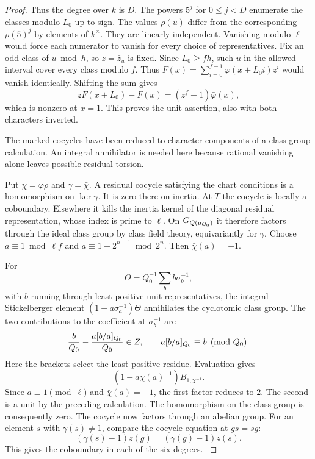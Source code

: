 \begin{proof}
Thus the degree over \(k\) is \(D\).
The powers \(5^j\) for \(0\le j<D\) enumerate the classes modulo
\(L_0\) up to sign. The values \(\bar\rho(u)\) differ from the
corresponding \(\bar\rho(5)^j\) by elements of \(k^\times\).
They are linearly independent. Vanishing modulo \(\ell\) would
force each numerator to vanish for every choice of representatives.
Fix an odd class of \(u\bmod h\), so \(z=\bar z_u\) is fixed.
Since \(L_0\ge fh\), such \(u\) in the allowed interval cover
every class modulo \(f\). Thus
\(F(x)=\sum_{i=0}^{f-1}\bar\varphi(x+L_0i)z^i\) would vanish
identically. Shifting the sum gives
\[
        zF(x+L_0)-F(x)=(z^f-1)\bar\varphi(x),
\]
which is nonzero at \(x=1\). This proves the unit assertion,
also with both characters inverted.
\hfill\mbox{\cite{washington-nonp}}\label{cor:ordinary-residual-characters-1}


The marked cocycles have been reduced to character components of a class-group calculation. An integral annihilator is needed here because rational vanishing alone leaves possible residual torsion.


Put \(\chi=\varphi\rho\) and \(\gamma=\bar\chi\). A residual
cocycle satisfying the chart conditions is a homomorphism on
\(\ker\gamma\). It is zero there on inertia. At \(T\) the cocycle
is locally a coboundary. Elsewhere it kills the inertia kernel
of the diagonal residual representation, whose index is prime
to \(\ell\). On \(G_{Q(\mu_{Q_0})}\) it therefore factors through
the ideal class group by class field theory, equivariantly for
\(\gamma\). Choose \(a\equiv1\bmod\ell f\) and
\(a\equiv1+2^{n-1}\bmod 2^n\). Then \(\bar\chi(a)=-1\).

For
\[
 \Theta=Q_0^{-1}\sum_b b\sigma_b^{-1},
\]
with \(b\)
running through least positive unit representatives, the integral
Stickelberger element \((1-a\sigma_a^{-1})\Theta\) annihilates
the cyclotomic class group. The two contributions to the coefficient at \(\sigma_b^{-1}\) are
\[
 \frac{b}{Q_0}-\frac{a[b/a]_{Q_0}}{Q_0}\in Z ,
 \qquad a[b/a]_{Q_0}\equiv b\pmod {Q_0}.
\]
Here the brackets select the least positive residue. Evaluation gives
\[
         (1-a\chi(a)^{-1})B_{1,\chi^{-1}}.
\]
Since \(a\equiv1\pmod\ell\) and \(\bar\chi(a)=-1\), the first
factor reduces to \(2\). The second is a unit by the preceding
calculation.
The homomorphism on the class group is consequently zero. The
cocycle now factors through an abelian group. For an element \(s\) with \(\gamma(s)\ne1\), compare the
cocycle equation at \(gs=sg\):
\[
      (\gamma(s)-1)z(g)=(\gamma(g)-1)z(s).
\]
This gives the coboundary in each of the six degrees.
\hfill\mbox{\cite{washington-cyclo}}\label{cor:ordinary-residual-characters-2}
\end{proof}
